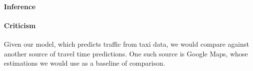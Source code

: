 \documentclass{article}
\begin{document}
\paragraph{Inference}

\paragraph{Criticism}

Given our model, which predicts traffic from taxi data, we would compare against another source of travel time predictions. One such source is Google Maps, whose estimations we would use as a baseline of comparison.




\end{document}
